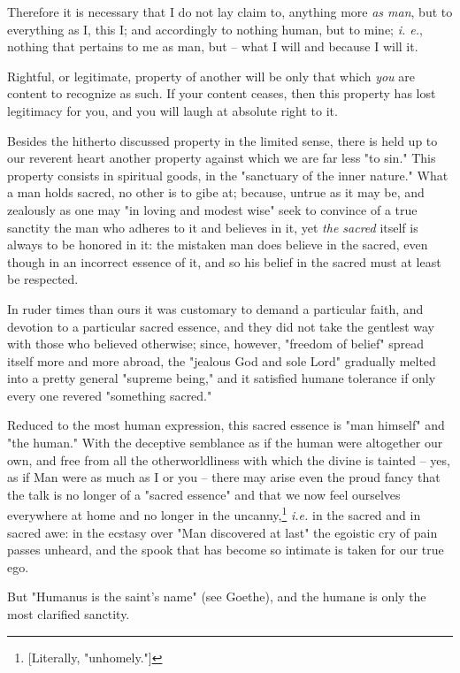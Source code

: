 \documentclass[a4paper]{book}
\begin{document}
Therefore it is necessary that I do not lay claim to, anything more \textit{as 
man}, but to everything as I, this I; and accordingly to nothing human, but to 
mine; \textit{i. e.}, nothing that pertains to me as man, but -- what I will 
and because I will it.

Rightful, or legitimate, property of another will be only that which 
\textit{you} are content to recognize as such. If your content ceases, then 
this property has lost legitimacy for you, and you will laugh at absolute 
right to it.

Besides the hitherto discussed property in the limited sense, there is held up 
to our reverent heart another property against which we are far less "{}to 
sin."{} This property consists in spiritual goods, in the "{}sanctuary of the 
inner nature."{} What a man holds sacred, no other is to gibe at; because, 
untrue as it may be, and zealously as one may "{}in loving and modest wise"{} 
seek to convince of a true sanctity the man who adheres to it and believes in 
it, yet \textit{the sacred} itself is always to be honored in it: the mistaken 
man does believe in the sacred, even though in an incorrect essence of it, and 
so his belief in the sacred must at least be respected.

In ruder times than ours it was customary to demand a particular faith, and 
devotion to a particular sacred essence, and they did not take the gentlest 
way with those who believed otherwise; since, however, "{}freedom of belief"{} 
spread itself more and more abroad, the "{}jealous God and sole Lord"{} 
gradually melted into a pretty general "{}supreme being,"{} and it satisfied 
humane tolerance if only every one revered "{}something sacred."{}

Reduced to the most human expression, this sacred essence is "{}man himself"{} 
and "{}the human."{} With the deceptive semblance as if the human were 
altogether our own, and free from all the otherworldliness with which the 
divine is tainted -- yes, as if Man were as much as I or you -- there may 
arise even the proud fancy that the talk is no longer of a "{}sacred 
essence"{} and that we now feel ourselves everywhere at home and no longer in 
the uncanny,\footnote{[Literally, "{}unhomely."{}]} \textit{i.e.} in the 
sacred and in sacred awe: in the ecstasy over "{}Man discovered at last"{} the 
egoistic cry of pain passes unheard, and the spook that has become so intimate 
is taken for our true ego.

But "{}Humanus is the saint's name"{} (see Goethe), and the humane is only the 
most clarified sanctity.
\end{document}
